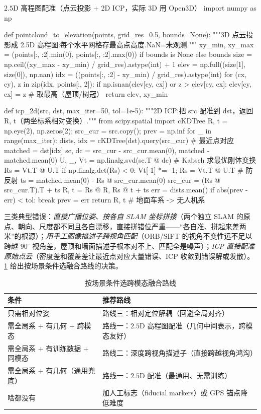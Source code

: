 \begin{codebox}[Python]{$2.5$D 高程图配准（点云投影 $+$ 2D ICP，实际 3D 用 Open3D）}
import numpy as np

def pointcloud_to_elevation(points, grid_res=0.5, bounds=None):
    """3D 点云投影成 2.5D 高程图:每个水平网格存最高点高度.NaN=未观测."""
    xy_min, xy_max = (points[:, :2].min(0), points[:, :2].max(0)) if bounds is None else bounds
    size = np.ceil((xy_max - xy_min) / grid_res).astype(int) + 1
    elev = np.full((size[1], size[0]), np.nan)
    idx = ((points[:, :2] - xy_min) / grid_res).astype(int)
    for (cx, cy), z in zip(idx, points[:, 2]):
        if np.isnan(elev[cy, cx]) or z > elev[cy, cx]:
            elev[cy, cx] = z                              # 取最高（屋顶/树冠）
    return elev, xy_min

def icp_2d(src, dst, max_iter=50, tol=1e-5):
    """2D ICP:把 src 配准到 dst，返回 R, t（两坐标系相对变换）."""
    from scipy.spatial import cKDTree
    R, t = np.eye(2), np.zeros(2); src_cur = src.copy(); prev = np.inf
    for _ in range(max_iter):
        dists, idx = cKDTree(dst).query(src_cur)         # 最近点对应
        matched = dst[idx]
        sc, dc = src_cur - src_cur.mean(0), matched - matched.mean(0)
        U, _, Vt = np.linalg.svd(sc.T @ dc)              # Kabsch 求最优刚体变换
        Rs = Vt.T @ U.T
        if np.linalg.det(Rs) < 0: Vt[-1] *= -1; Rs = Vt.T @ U.T   # 防反射
        ts = matched.mean(0) - Rs @ src_cur.mean(0)
        src_cur = (Rs @ src_cur.T).T + ts
        R, t = Rs @ R, Rs @ t + ts
        err = dists.mean()
        if abs(prev - err) < tol: break
        prev = err
    return R, t                                          # 地面车系 -> 无人机系
\end{codebox}

\noindent 三类典型错误：\emph{直接广播位姿、按各自 SLAM 坐标拼接}（两个独立 SLAM 的原点、朝向、尺度都不同且各自漂移，直接拼错位严重——“各自准、拼起来差两米”的根源）；\emph{用手工图像描述子跨视角匹配}（ORB/SIFT 的视角不变性远不足以跨越 $90^\circ$ 视角差，屋顶和墙面描述子根本对不上、匹配全是噪声）；\emph{ICP 直接配准原始点云}（密度差和覆盖差让最近点对应大量错误、ICP 收敛到错误解或发散）。\cref{tab:hmr-fusion-choice} 给出按场景条件选融合路线的决策。

\begin{table}[H]\centering\small
\caption{按场景条件选跨模态融合路线}
\label{tab:hmr-fusion-choice}
\begin{tabular}{ll}
\toprule
条件 & 推荐路线 \\
\midrule
只需相对位姿 & 路线三：相对定位解耦（回避全局对齐） \\
需全局系 $+$ 有几何 $+$ 跨模态 & 路线一：$2.5\mathrm{D}$ 高程图配准（几何中间表示，跨模态友好） \\
需全局系 $+$ 有训练数据 $+$ 同模态 & 路线二：深度跨视角描述子（直接跨越视角鸿沟） \\
需全局系 $+$ 有几何（通用兜底） & 路线一：$2.5\mathrm{D}$ 配准（最通用、无需训练） \\
啥都没有 & 加人工标志（fiducial markers）或 GPS 锚点降低难度 \\
\bottomrule
\end{tabular}
\end{table}

